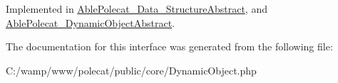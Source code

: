 Implemented in \hyperlink{class_able_polecat___data___structure_abstract_ae19bae5fa6db97601313c55ad17508e9}{Able\+Polecat\+\_\+\+Data\+\_\+\+Structure\+Abstract}, and \hyperlink{class_able_polecat___dynamic_object_abstract_ae19bae5fa6db97601313c55ad17508e9}{Able\+Polecat\+\_\+\+Dynamic\+Object\+Abstract}.



The documentation for this interface was generated from the following file\+:\begin{DoxyCompactItemize}
\item 
C\+:/wamp/www/polecat/public/core/Dynamic\+Object.\+php\end{DoxyCompactItemize}
